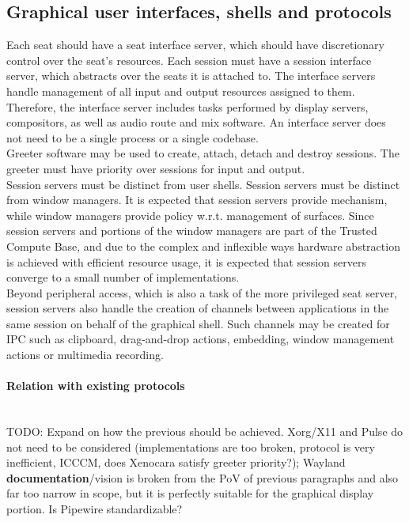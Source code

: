 \documentclass[a4paper,utf8,11pt]{article}
\begin{document}
	\subsection{Graphical user interfaces, shells and protocols}
	Each seat should have a seat interface server, which should have discretionary control over the seat's resources. Each session must have a session interface server, which abstracts over the seats it is attached to. The interface servers handle management of all input and output resources assigned to them. Therefore, the interface server includes tasks performed by display servers, compositors, as well as audio route and mix software. An interface server does not need to be a single process or a single codebase.\\
	Greeter software may be used to create, attach, detach and destroy sessions. The greeter must have priority over sessions for input and output.\\
	Session servers must be distinct from user shells. Session servers must be distinct from window managers. It is expected that session servers provide mechanism, while window managers provide policy w.r.t. management of surfaces. Since session servers and portions of the window managers are part of the Trusted Compute Base, and due to the complex and inflexible ways hardware abstraction is achieved with efficient resource usage, it is expected that session servers converge to a small number of implementations.\\
	Beyond peripheral access, which is also a task of the more privileged seat server, session servers also handle the creation of channels between applications in the same session on behalf of the graphical shell. Such channels may be created for IPC such as clipboard, drag-and-drop actions, embedding, window management actions or multimedia recording.
	\paragraph{Relation with existing protocols}\quad\\
	TODO: Expand on how the previous should be achieved. Xorg/X11 and Pulse do not need to be considered (implementations are too broken, protocol is very inefficient, ICCCM, does Xenocara satisfy greeter priority?); Wayland \textbf{documentation}/vision is broken from the PoV of previous paragraphs and also far too narrow in scope, but it is perfectly suitable for the graphical display portion. Is Pipewire standardizable?
	\clearpage
\end{document}
